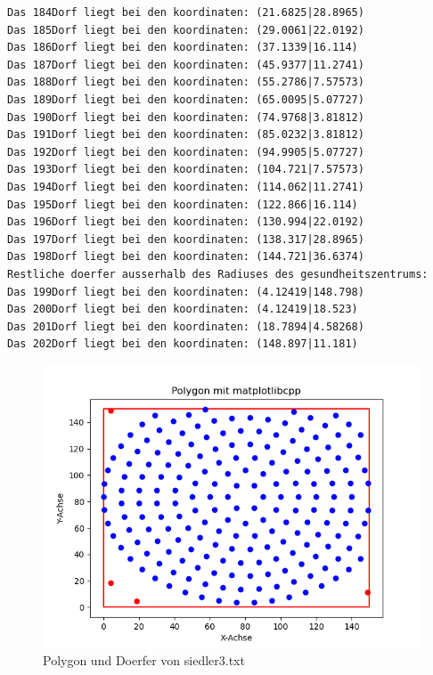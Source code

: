 \documentclass{article}
\begin{document}
\begin{verbatim}
Das 184Dorf liegt bei den koordinaten: (21.6825|28.8965)
Das 185Dorf liegt bei den koordinaten: (29.0061|22.0192)
Das 186Dorf liegt bei den koordinaten: (37.1339|16.114)
Das 187Dorf liegt bei den koordinaten: (45.9377|11.2741)
Das 188Dorf liegt bei den koordinaten: (55.2786|7.57573)
Das 189Dorf liegt bei den koordinaten: (65.0095|5.07727)
Das 190Dorf liegt bei den koordinaten: (74.9768|3.81812)
Das 191Dorf liegt bei den koordinaten: (85.0232|3.81812)
Das 192Dorf liegt bei den koordinaten: (94.9905|5.07727)
Das 193Dorf liegt bei den koordinaten: (104.721|7.57573)
Das 194Dorf liegt bei den koordinaten: (114.062|11.2741)
Das 195Dorf liegt bei den koordinaten: (122.866|16.114)
Das 196Dorf liegt bei den koordinaten: (130.994|22.0192)
Das 197Dorf liegt bei den koordinaten: (138.317|28.8965)
Das 198Dorf liegt bei den koordinaten: (144.721|36.6374)
Restliche doerfer ausserhalb des Radiuses des gesundheitszentrums: 
Das 199Dorf liegt bei den koordinaten: (4.12419|148.798)
Das 200Dorf liegt bei den koordinaten: (4.12419|18.523)
Das 201Dorf liegt bei den koordinaten: (18.7894|4.58268)
Das 202Dorf liegt bei den koordinaten: (148.897|11.181)

\end{verbatim}
\newpage
\begin{figure}[h]
    \centering
    \includegraphics[width=1\textwidth]{Bilder/Figure_3.png}
    \caption{Polygon und Doerfer von siedler3.txt}
    \label{fig:example}
\end{figure}
\end{document}
